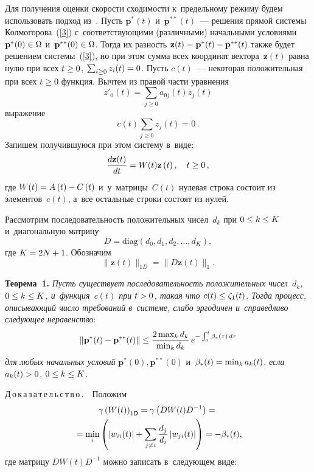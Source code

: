 \begin{multicols}{2}
\vspace*{-1pt}

Для получения оценки ско\-рости схо\-ди\-мости к~предельному режиму будем использовать 
подход из~\cite{KSSZ2022}. Пусть $ \mathbf{p}^*(t) $  и~$ \mathbf{p}^{**}(t) $~--- решения 
прямой сис\-те\-мы Колмогорова~(\ref{3}) с~со\-от\-вет\-ст\-ву\-ющи\-ми (различными)
начальными условиями $\mathbf{p}^*(0) \hm\in \Omega $ и~$ \mathbf{p}^{**}(0) \hm\in \Omega $. Тогда 
их раз\-ность $\mathbf{z}(t) \hm= \mathbf{p}^*(t) \hm- \mathbf{p}^{**}(t)$ так\-же будет решением сис\-те\-мы~(\ref{3}), 
но при этом сумма всех координат вектора~$\mathbf{z}(t)$ рав\-на нулю при всех 
$t \hm\ge 0$, $\sum_{i\ge 0} z_i(t) \hm= 0$.
Пусть $c(t)$~--- некоторая положительная при всех $t\ge 0$ 
функция. Вычтем из правой час\-ти уравнения 
$$
z'_0(t) = \sum\limits_{j \ge 0} 
a_{0j}(t)z_j(t)
$$ 
выражение  
$$
 c(t) \sum\limits_{j \ge 0} z_j(t) = 0\,.
 $$
Запишем по\-лу\-чив\-шу\-юся при этом сис\-те\-му в~\mbox{виде}:
$$
\displaystyle\frac{\displaystyle d\mathbf{z}(t)\mathstrut}{\displaystyle dt\mathstrut}=W(t)\mathbf{z} \left(t\right), \quad t\ge 0\,,
 \label{5}
$$
 где $ W(t) \hm= A\left( t\right)\hm-C\left( t\right)$ 
и~у~мат\-ри\-цы~$C(t)$ нулевая строка со\-сто\-ит из элементов~$c(t)$, а~все остальные строки со\-сто\-ят из ну\-лей.
    
Рассмотрим по\-сле\-до\-ва\-тель\-ность положительных чисел~$d_k$ при $0\hm \leq k \hm\leq K$ 
и~диагональную мат\-ри\-цу 
$$
D = \mathrm{diag}\left(d_0, d_1, d_2, \dots, d_K \right),
$$ 
где $K \hm= 2N\hm+1$. Обозначим 
$$
\|\mathbf{z}(t)\|_{1D} = \|D\mathbf{z}(t)\|_1.
$$

\smallskip

\noindent
\textbf{Теорема~1.}
\textit{Пусть существует по\-сле\-до\-ва\-тель\-ность положительных 
чисел~$d_k$, $0 \hm\leq k \hm\leq K$, и~функция~$c(t)$ при $t \hm> 0$, такая что $c(t) 
\hm\le \zeta_1(t)$. Тогда процесс, опи\-сы\-ва\-ющий чис\-ло требований в~сис\-те\-ме, слабо  
эргодичен и~справедливо сле\-ду\-ющее не\-ра\-вен\-ство}:
    $$
    \|\mathbf{p}^*(t) - \mathbf{p}^{**}(t)\| \leq  \displaystyle\frac{\displaystyle 2\max\nolimits_k d_k\mathstrut}{\displaystyle \min\nolimits_k d_k\mathstrut}\,e^{-\int\nolimits_0^t\beta_{*}(\tau)\, d\tau}
    $$  
\textit{для любых начальных условий} $ \mathbf{p}^{*}(0), \mathbf{p}^{**}(0)$ и~$\beta_{*}(t) 
\hm= \min_k a_k(t)$, \textit{если} $a_k(t) \hm> 0$,  $0 \hm\leq k \hm\leq K$.

\smallskip      


\noindent
Д\,о\,к\,а\,з\,а\,т\,е\,л\,ь\,с\,т\,в\,о\,.\ \
Положим
\begin{multline*}
    \gamma\left(W(t)\right)_{1\textsf{D}} = \gamma \left({D} 
W(t){D}^{-1}\right)  ={}\\
{}= \min\limits_i \left(|w_{ii}(t)| + \sum\limits_{j\neq i}\displaystyle\frac{\displaystyle d_j\mathstrut}{\displaystyle d_i\mathstrut}\left\vert w_{ji}(t)\right\vert \right) =  - \beta_{*}(t),
\end{multline*}
где матрицу $DW(t)D^{-1}$ мож\-но записать в~сле\-ду\-ющем \mbox{виде}:

\end{multicols}

